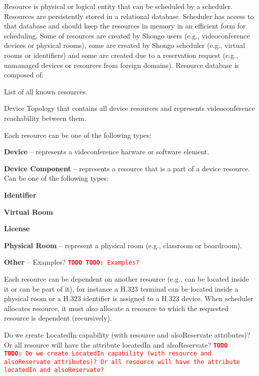 \documentclass[a4paper]{report}
\newcommand{\TODO}[1]{%
\def\empty{}%
\def\prvniparametr{#1}%
\ifx\prvniparametr\empty%
\begingroup\tt\textcolor{red}{\noindent\textbf{TODO}}\endgroup
\else%
\begingroup\tt\textcolor{red}{\noindent\textbf{TODO:}\ #1}\endgroup
\fi%
}
\begin{document}
Resource is physical or logical entity that can be scheduled by a scheduler. Resources are persistently stored in a relational database. Scheduler has access to that database and should keep the resources in memory in an efficient form for scheduling. Some of resources are created by Shongo users (e.g., videoconference devices or physical rooms), some are created by Shongo scheduler (e.g., virtual rooms or identifiers) and some are created due to a reservation request (e.g., unmanaged devices or resources from foreign domains). Resource database is composed of:
\begin{compactenum}
\item List of all known resources.
\item Device Topology that contains all device resources and represents videoconference reachability between them.
\end{compactenum}
Each resource can be one of the following types:
\begin{compactenum}
\item \textbf{Device} -- represents a videconference harware or software element.
\item \textbf{Device Component} -- represents a resource that is a part of a device resource. Can be one of the following types:
  \begin{compactenum}
    \item \textbf{Identifier}
    \item \textbf{Virtual Room}
    \item \textbf{License}
  \end{compactenum}
\item \textbf{Physical Room} -- represent a physical room (e.g., classroom or boardroom).
\item \textbf{Other} -- \TODO{Examples?}
\end{compactenum}
Each resource can be dependent on another resource (e.g., can be located inside it or can be part of it), for instance a H.323 terminal can be located inside a physical room or a H.323 identifier is assigned to a H.323 device. When scheduler allocates resource, it must also allocate a resource to which the requested resource is dependent (recursively).

\TODO{Do we create LocatedIn capability (with resource and alsoReservate attributes)? Or all resource will have the attribute locatedIn and alsoReservate?}
\end{document}
